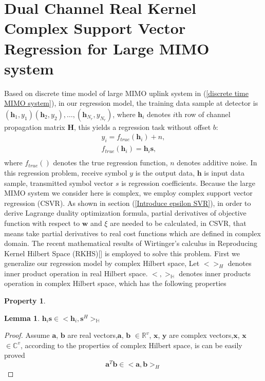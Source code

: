 \documentclass[12pt, draftclsnofoot, onecolumn]{IEEEtran}
\begin{document}
\section{Dual Channel Real Kernel Complex Support Vector Regression for Large MIMO system}\label{dual channel CSVR}
 Based on discrete time model of large MIMO uplink system in (\ref{discrete time MIMO system}), in our  regression model, the training data sample at detector is $(\mathbf{h}_{1}, y_{1})(\mathbf{h}_{2}, y_{2}), \ldots, (\mathbf{h}_{N_{r}}, y_{N_{r}})$, where $\mathbf{h}_{i}$ denotes $i$th row of channel propagation matrix $\mathbf{H}$, this yields a regression task without offset $b$:  
 \begin{eqnarray}
 y_{i}=f_{true}(\mathbf{h}_{i})+n,\\
 \label{regression part1a}
 f_{true}(\mathbf{h}_{i})=\mathbf{h}_{i}\mathbf{s},\\
 \label{regression part1b}
 \end{eqnarray}
 where $f_{true}()$ denotes the true regression function, $n$ denotes additive noise.
In this regression problem, receive symbol $y$ is the output data, $\mathbf{h}$ is input data sample, transmitted symbol vector $s$ is regression coefficients. Because the large MIMO system we consider here is complex, we employ complex support vector regression (CSVR). As shown in section (\ref{Introduce epsilon SVR}), in order to derive Lagrange duality optimization formula, partial derivatives of objective function with respect to $\mathbf{w}$ and $\xi$ are needed to be calculated, in CSVR, that means take partial derivatives to real cost functions which are defined in complex domain. The recent mathematical results of Wirtinger's calculus in Reproducing Kernel Hilbert Space (RKHS)[\cite{wirtinger's calculus}] is employed to solve this problem. First we generalize our regression model by complex Hilbert space, 
Let $<>_{H}$ denotes inner product operation in real Hilbert space. $<,>_{\mathbb{H}}$ denotes inner products operation in complex Hilbert space, which has the following properties 
\newtheorem{Lemma}{Lemma}
\newtheorem{Property}{Property}
\begin{Property}
\label{Property1}
\end{Property}
\begin{Lemma}
$\mathbf{h}_{i}\mathbf{s}\in <\mathbf{h}_{i},\mathbf{s}^{H}>_{\mathbb{H}}$
\end{Lemma}    

\begin{proof}

Assume $\mathbf{a}$, $\mathbf{b}$ are real vectors,$\mathbf{a}$, $\mathbf{b}$ $\in \mathbb{R}^{v}$, $\mathbf{x}$, $\mathbf{y}$ are complex vectors,$\mathbf{x}$, $\mathbf{x}$ $\in \mathbb{C}^{v}$, according to the properties of complex Hilbert space, is can be easily proved 
\begin{equation}
\mathbf{a}^{T}\mathbf{b} \in <\mathbf{a}, \mathbf{b}>_{H}
\end{equation}
\end{proof}
\end{document}

